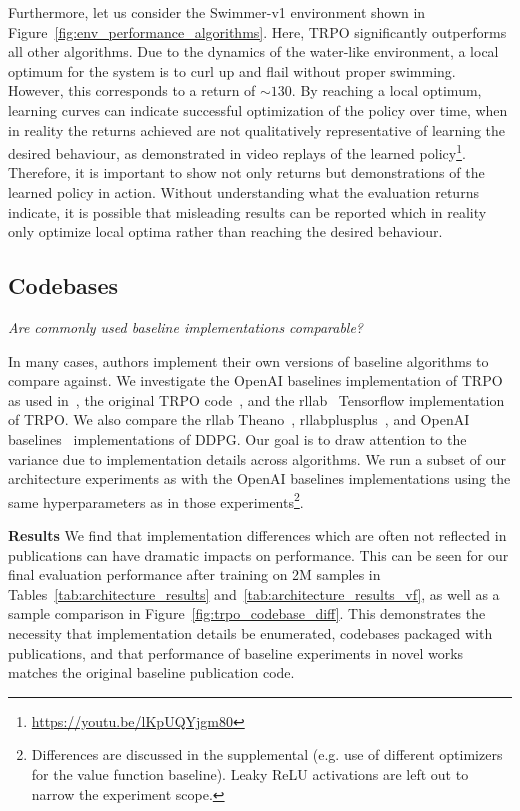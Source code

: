 \documentclass[letterpaper]{article} %
\begin{document}
Furthermore, let us consider the Swimmer-v1 environment shown in Figure~\ref{fig:env_performance_algorithms}. Here, TRPO significantly outperforms all other algorithms. Due to the dynamics of the water-like environment, a local optimum for the system is to curl up and flail without proper swimming. However, this corresponds to a return of ${\sim} 130$. By reaching a local optimum, learning curves can indicate successful optimization of the policy over time, when in reality the returns achieved are not qualitatively representative of learning the desired behaviour, as demonstrated in video replays of the learned policy\footnote{\url{https://youtu.be/lKpUQYjgm80}}. Therefore, it is important to show not only returns but demonstrations of the learned policy in action. Without understanding what the evaluation returns indicate, it is possible that misleading results can be reported which in reality only optimize local optima rather than reaching the desired behaviour.

\subsection{Codebases}
\textit{Are commonly used baseline implementations comparable?}
\medskip

\noindent In many cases, authors implement their own versions of baseline algorithms to compare against. We investigate the OpenAI baselines implementation of TRPO as used in~\cite{PPO}, the original TRPO code~\cite{TRPO}, and the rllab~\cite{rllab} Tensorflow implementation of TRPO. We also compare the rllab Theano~\cite{rllab}, rllabplusplus~\cite{QPROP}, and OpenAI baselines~\cite{plappert2017parameter} implementations of DDPG. Our goal is to draw attention to the variance due to implementation details across algorithms. We run a subset of our architecture experiments as with the OpenAI baselines implementations using the same hyperparameters as in those experiments\footnote{Differences are discussed in the supplemental (e.g. use of different optimizers for the value function baseline). Leaky ReLU activations are left out to narrow the experiment scope.}.

\textbf{Results} We find that implementation differences which are often not reflected in publications can have dramatic impacts on performance. This can be seen for our final evaluation performance after training on 2M samples in Tables~\ref{tab:architecture_results} and~\ref{tab:architecture_results_vf}, as well as a sample comparison in Figure~\ref{fig:trpo_codebase_diff}. This demonstrates the necessity that implementation details be enumerated, codebases packaged with publications, and that performance of baseline experiments in novel works matches the original baseline publication code.
\end{document}
